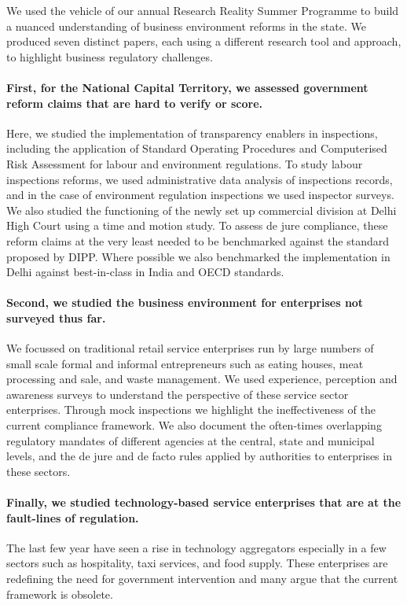 \documentclass[a4paper, 12pt, twoside]{article}
\begin{document}
We used the vehicle of our annual Research Reality Summer Programme to build a nuanced understanding of business environment reforms in the state. We produced seven distinct papers, each using a different research tool and approach, to highlight business regulatory challenges. \\

\paragraph{First, for the National Capital Territory, we assessed government reform claims that are hard to verify or score.} Here, we studied the implementation of transparency enablers in inspections, including the application of Standard Operating Procedures and Computerised Risk Assessment for labour and environment regulations. To study labour inspections reforms, we used administrative data analysis of inspections records, and in the case of environment regulation inspections we used inspector surveys. We also studied the functioning of the newly set up commercial division at Delhi High Court using a time and motion study. To assess de jure compliance, these reform claims at the very least needed to be benchmarked against the standard proposed by DIPP. Where possible we also benchmarked the implementation in Delhi against best-in-class in India and OECD standards. \\

\newpage

\paragraph{Second, we studied the business environment for enterprises not surveyed thus far.} We focussed on traditional retail service enterprises run by large numbers of small scale formal and informal entrepreneurs such as eating houses, meat processing and sale, and waste management. We used experience, perception and awareness surveys to understand the perspective of these service sector enterprises. Through mock inspections we highlight the ineffectiveness of the current compliance framework. We also document the often-times overlapping regulatory mandates of different agencies at the central, state and municipal levels, and the de jure and de facto rules applied by authorities to enterprises in these sectors. \\

\paragraph{Finally, we studied technology-based service enterprises that are at the fault-lines of regulation.} The last few year have seen a rise in technology aggregators especially in a few sectors such as hospitality, taxi services, and food supply. These enterprises are redefining the need for government intervention and many argue that the current framework is obsolete.\\
\end{document}
